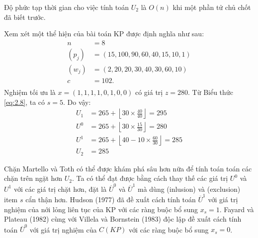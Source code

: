 Độ phức tạp thời gian cho việc tính toán $U_2$ là $O(n)$ khi một phần tử chủ chốt đã biết trước.

\begin{example}
    \label{eq:example_2.1}
    Xem xét một thể hiện của bài toán KP được định nghĩa như sau:
    \begin{align*}
        n &= 8\\
        (p_j) &= (15, 100, 90, 60, 40, 15, 10, 1)\\
        (w_j) &= (2, 20, 20, 30, 40, 30, 60, 10)\\
        c &= 102.\\
    \end{align*}
    Nghiệm tối ưu là $x = (1, 1, 1, 1, 0, 1, 0, 0)$ có giá trị $z = 280$. Từ Biểu thức \eqref{eq:2.8}, ta có $s = 5$. Do vậy:
    \begin{align*}
        U_1 &= 265 + \left \lfloor 30 \times \frac{40}{40}\right \rfloor = 295\\
        U^0 &= 265 + \left \lfloor 30 \times \frac{15}{30}\right \rfloor = 280\\
        U^1 &= 265 + \left \lfloor 40 - 10 \times \frac{60}{30}\right \rfloor = 285\\
        U_2 &= 285
    \end{align*}
\end{example}

Chặn Martello và Toth có thể được khám phá sâu hơn nữa để tính toán toán các chặn trên ngặt hơn $U_2$. Ta có thể đạt được bằng cách thay thế các giá trị $U^0$ và $U^1$ với các giá trị chặt hơn, đặt là $\overline{U}^0$ và $\overline{U}^1$ mà dùng  (inlusion) và  (exclusion) item $s$ cẩn thận hơn. Hudson (1977) đã đề xuất cách tính toán $\overline{U}^1$ với giá trị nghiệm của nới lỏng liên tục của KP với các ràng buộc bổ sung $x_s = 1$. Fayard và Plateau (1982) cùng với Villela và Bornstein (1983) độc lập đề xuất cách tính toán $\overline{U}^0$ với giá trị nghiệm của $C(KP)$ với các ràng buộc bổ sung $x_s = 0$.

